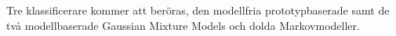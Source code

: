 \documentclass[../rapport_MVEX01-11-05]{subfiles}
\begin{document}
Tre klassificerare kommer att beröras, den modellfria
prototypbaserade \knn samt de två modellbaserade Gaussian Mixture
Models och dolda Markovmodeller.

%
\end{document}
